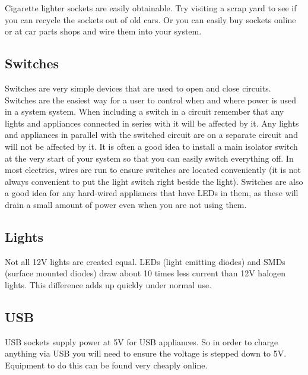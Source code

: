 \documentclass{article}
\theoremstyle{definition}
\theoremstyle{definition}
\theoremstyle{remark}
\begin{document}
    Cigarette lighter sockets are easily obtainable. Try visiting a scrap yard to see if you can recycle the sockets out of old cars. Or you can easily buy sockets online or at car parts shops and wire them into your system.
  

  {\color{blue}\subsection{Switches}} %
  \label{sub:switches}

    Switches are very simple devices that are used to open and close circuits. Switches are the easiest way for a user to control when and where power is used in a system system. When including a switch in a circuit remember that any lights and appliances connected in series with it will be affected by it. Any lights and appliances in parallel with the switched circuit are on a separate circuit and will not be affected by it. It is often a good idea to install a main isolator switch at the very start of your system so that you can easily switch everything off. In most electrics, wires are run to ensure switches are located conveniently (it is not always convenient to put the light switch right beside the light). Switches are also a good idea for any hard-wired appliances that have LEDs in them, as these will drain a small amount of power even when you are not using them.
  

  {\color{blue}\subsection{Lights}} %
  \label{sub:lights}

    Not all 12V lights are created equal. LEDs (light emitting diodes) and SMDs (surface mounted diodes) draw about 10 times less current than 12V halogen lights. This difference adds up quickly under normal use. 
  

  {\color{blue}\subsection{USB}} %
  \label{sub:usb}

    USB sockets supply power at 5V for USB appliances. So in order to charge anything via USB you will need to ensure the voltage is stepped down to 5V. Equipment to do this can be found very cheaply online. 
  
\end{document}
